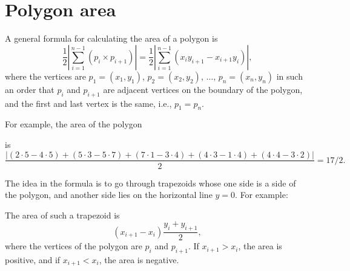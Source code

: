 \section{Polygon area}

A general formula for calculating the area
of a polygon is
\[\frac{1}{2} |\sum_{i=1}^{n-1} (p_i \times p_{i+1})| =
\frac{1}{2} |\sum_{i=1}^{n-1} (x_i y_{i+1} - x_{i+1} y_i)|, \]
where the vertices are
$p_1=(x_1,y_1)$, $p_2=(x_2,y_2)$, $\ldots$, $p_n=(x_n,y_n)$
in such an order that
$p_i$ and $p_{i+1}$ are adjacent vertices on the boundary
of the polygon,
and the first and last vertex is the same, i.e., $p_1=p_n$.

For example, the area of the polygon
\begin{center}
\end{center}
is
\[\frac{|(2\cdot5-4\cdot5)+(5\cdot3-5\cdot7)+(7\cdot1-3\cdot4)+(4\cdot3-1\cdot4)+(4\cdot4-3\cdot2)|}{2} = 17/2.\]

The idea in the formula is to go through trapezoids
whose one side is a side of the polygon,
and another side lies on the horizontal line $y=0$.
For example:
\begin{center}
\end{center}
The area of such a trapezoid is
\[(x_{i+1}-x_{i}) \frac{y_i+y_{i+1}}{2},\]
where the vertices of the polygon are $p_i$ and $p_{i+1}$.
If $x_{i+1}>x_{i}$, the area is positive,
and if $x_{i+1}<x_{i}$, the area is negative.

